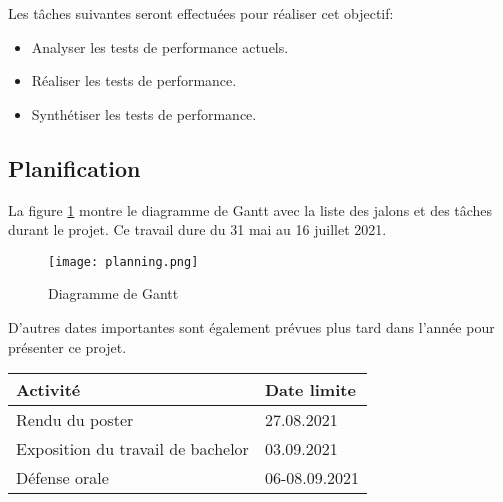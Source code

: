 Les tâches suivantes seront effectuées pour réaliser cet objectif:
\begin{itemize}
    \item Analyser les tests de performance actuels.
    \item Réaliser les tests de performance.
    \item Synthétiser les tests de performance.
\end{itemize}

\begin{landscape}
\section{Planification}
La figure \ref{fig:gantt} montre le diagramme de Gantt avec la liste des jalons et des tâches durant le projet. Ce travail dure du 31 mai au 16 juillet 2021.
\begin{figure}[h!]
   \centering
    \texttt{[image: planning.png]}
    \caption{Diagramme de Gantt}
    \label{fig:gantt}
\end{figure}

D'autres dates importantes sont également prévues plus tard dans l'année pour présenter ce projet.

\begin{table}[ht]
    \begin{tabularx}{\columnwidth}{ | X | p{8em} |}
        \hline
        \textbf{Activité} & \textbf{Date limite} \\
        \hline
        Rendu du poster & 27.08.2021 \\
        Exposition du travail de bachelor & 03.09.2021 \\
        Défense orale & 06-08.09.2021 \\
        \hline
    \end{tabularx}
\end{table}

\end{landscape} 